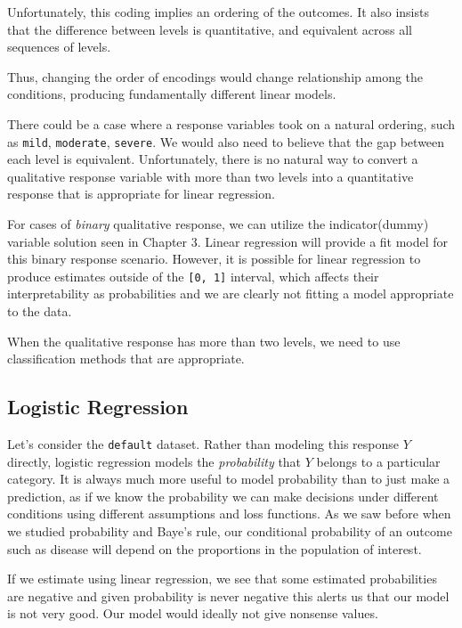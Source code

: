 \documentclass[
]{article}
\begin{document}
Unfortunately, this coding implies an ordering of the outcomes. It also
insists that the difference between levels is quantitative, and
equivalent across all sequences of levels.

Thus, changing the order of encodings would change relationship among
the conditions, producing fundamentally different linear models.

There could be a case where a response variables took on a natural
ordering, such as \texttt{mild}, \texttt{moderate}, \texttt{severe}. We
would also need to believe that the gap between each level is
equivalent. Unfortunately, there is no natural way to convert a
qualitative response variable with more than two levels into a
quantitative response that is appropriate for linear regression.

For cases of \emph{binary} qualitative response, we can utilize the
indicator(dummy) variable solution seen in Chapter 3. Linear regression
will provide a fit model for this binary response scenario. However, it
is possible for linear regression to produce estimates outside of the
\texttt{{[}0,\ 1{]}} interval, which affects their interpretability as
probabilities and we are clearly not fitting a model appropriate to the
data.

When the qualitative response has more than two levels, we need to use
classification methods that are appropriate.

\hypertarget{logistic-regression}{%
\subsection{Logistic Regression}\label{logistic-regression}}

Let's consider the \texttt{default} dataset. Rather than modeling this
response \(Y\) directly, logistic regression models the
\emph{probability} that \(Y\) belongs to a particular category. It is
always much more useful to model probability than to just make a
prediction, as if we know the probability we can make decisions under
different conditions using different assumptions and loss functions. As
we saw before when we studied probability and Baye's rule, our
conditional probability of an outcome such as disease will depend on the
proportions in the population of interest.

If we estimate using linear regression, we see that some estimated
probabilities are negative and given probability is never negative this
alerts us that our model is not very good. Our model would ideally not
give nonsense values.
\end{document}
